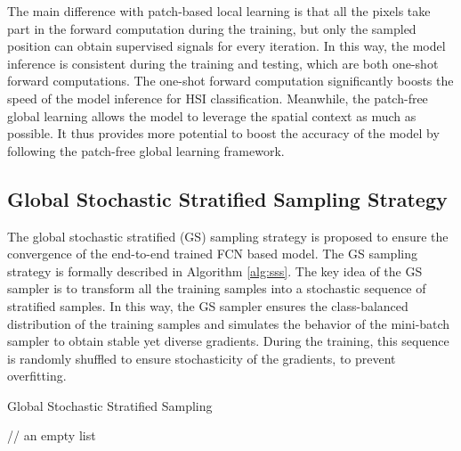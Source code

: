 \documentclass[journal]{IEEEtran}
\begin{document}
The main difference with patch-based local learning is that all the pixels take part in the forward computation during the training, but only the sampled position can obtain supervised signals for every iteration.
In this way, the model inference is consistent during the training and testing, which are both one-shot forward computations.
The one-shot forward computation significantly boosts the speed of the model inference for HSI classification.
Meanwhile, the patch-free global learning allows the model to leverage the spatial context as much as possible.
It thus provides more potential to boost the accuracy of the model by following the patch-free global learning framework.






\subsection{Global Stochastic Stratified Sampling Strategy}
\label{sec:gs2_sampler}
The global stochastic stratified (GS) sampling strategy is proposed to ensure the convergence of the end-to-end trained FCN based model.
The GS sampling strategy is formally described in Algorithm \ref{alg:sss}.
The key idea of the GS sampler is to transform all the training samples into a stochastic sequence of stratified samples.
In this way, the GS sampler ensures the class-balanced distribution of the training samples and simulates the behavior of the mini-batch sampler to obtain stable yet diverse gradients.
During the training, this sequence is randomly shuffled to ensure stochasticity of the gradients, to prevent overfitting.

\begin{algorithm}[t]
  \caption{Global Stochastic Stratified Sampling\label{alg:sss}}
   // an empty list \\
   \\
   \\
\end{algorithm}
\end{document}
